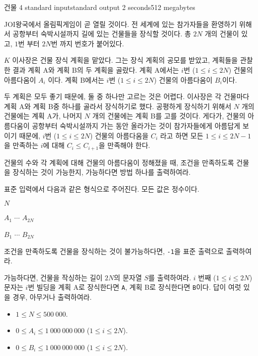 \begin{problem}{건물 4}
	{standard input}{standard output}
	{2 seconds}{512 megabytes}{}
	
	JOI왕국에서 올림픽게임이 곧 열릴 것이다. 전 세계에 있는 참가자들을 환영하기 위해서 공항부터 숙박시설까지 길에 있는 건물들을 장식할 것이다. 총 $2N$ 개의 건물이 있고, $1$번 부터 $2N$번 까지 번호가 붙어있다.
	
	$K$ 이사장은 건물 장식 계획을 맡았다. 그는 장식 계획의 공모를 받았고, 계획들을 관찰한 결과 계획 A와 계획 B의 두 계획을 골랐다. 계획 A에서는 $i$번 ($1 \le i \le 2N$) 건물의 아름다움이 $A_i$ 이다. 계획 B에서는 $i$번 ($1 \le i \le 2N$) 건물의 아름다움이 $B_i$이다.
	
	두 계획은 모두 좋기 때문에, 둘 중 하나만 고르는 것은 어렵다. 이사장은 각 건물마다 계획 A와 계획 B중 하나를 골라서 장식하기로 했다. 공평하게 장식하기 위해서 $N$ 개의 건물에는 계획 A가, 나머지 $N$ 개의 건물에는 계획 B를 고를 것이다. 게다가, 건물의 아름다움이 공항부터 숙박시설까지 가는 동안 올라가는 것이 참가자들에게 아름답게 보이기 때문에, $i$번 ($1 \le i \le 2N$) 건물의 아름다움을 $C_i$ 라고 하면 모든 $1 \le i \le 2N-1$을 만족하는 $i$에 대해 $C_i \le C_{i+1}$을 만족해야 한다.
	
	건물의 수와 각 계획에 대해 건물의 아름다움이 정해졌을 때, 조건을 만족하도록 건물을 장식하는 것이 가능한지, 가능하다면 방법 하나를 출력하여라.
	
	\InputFile
	
	표준 입력에서 다음과 같은 형식으로 주어진다. 모든 값은 정수이다.

	$N$
	
	$A_1$ $\cdots$ $A_{2N}$
	
	$B_1$ $\cdots$ $B_{2N}$
	
	\OutputFile
	
	조건을 만족하도록 건물을 장식하는 것이 불가능하다면, \texttt{-1}을 표준 출력으로 출력하여라.
	
	가능하다면, 건물을 작싱하는 길이 $2N$의 문자열 $S$를 출력하여라. $i$ 번째 ($1 \le i \le 2N$) 문자는 $i$번 빌딩을 계획 A로 장식한다면 \texttt{A}, 계획 B로 장식한다면 \texttt{B}이다. 답이 여럿 있을 경우, 아무거나 출력하여라.
	
	\Constraints
	
	\begin{itemize}
	\item $1 \le N \le 500\ 000$.
	\item $0 \le A_i \le 1\ 000\ 000\ 000$ ($1 \le i \le 2N$).
	\item $0 \le B_i \le 1\ 000\ 000\ 000$ ($1 \le i \le 2N$).
	\end{itemize}
	

\end{problem}

